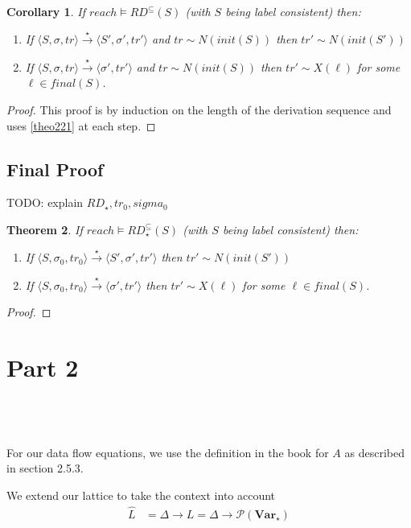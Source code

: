 \documentclass[a4wide,12pt]{article}
\theoremstyle{definition}
\theoremstyle{plain}
\newtheorem{theo}{Theorem}
\newtheorem{cor}[theo]{Corollary}
\theoremstyle{remark}
\def\pset#1{\mathcal{P}(#1)}
\def\const#1{\mathopen{\langle}#1\mathclose{\rangle}} %
\def\pair#1{\const{#1}}
\def\Var {\mathbf{Var}}
\def\starto{\overset{\star}{\to}}
\begin{document}
\begin{cor}
If $reach \models RD^\subseteq(S)$ (with $S$ being label consistent) then:

\begin{enumerate}
\item If $\pair{S, \sigma, tr} \starto \pair{S', \sigma', tr'}$ and $ tr \sim
N(init(S))$ then $tr' \sim N(init(S'))$
\item If $\pair{S, \sigma, tr} \starto \pair{\sigma', tr'}$ and $ tr \sim
N(init(S))$ then $tr' \sim X(\ell)$ for some $\ell \in final(S)$.
\end{enumerate}
\end{cor}
\begin{proof}
This proof is by induction on the length of the derivation sequence and uses
\ref{theo221} at each step.
\end{proof}

\subsection{Final Proof}

TODO: explain $RD_\star, tr_0, sigma_0$

\begin{theo}
If $reach \models RD_\star^\subseteq(S)$ (with $S$ being label consistent) then:

\begin{enumerate}
\item If $\pair{S, \sigma_0, tr_0} \starto \pair{S', \sigma', tr'}$ then $ tr' \sim
N(init(S'))$ 
\item If $\pair{S, \sigma_0, tr_0} \starto \pair{\sigma', tr'}$ then $ tr' \sim
X(\ell)$ for some $\ell \in final(S)$.
\end{enumerate}
\end{theo}
\begin{proof}
\end{proof}
 
\section{Part 2}

\subsection{~}

For our data flow equations, we use the definition in the book for $A$ as
described in section 2.5.3.

We extend our lattice to take the context into account
\begin{align}
\widehat{L} & = \Delta \to L = \Delta \to \pset{\Var_\star}
\end{align}
\end{document}
